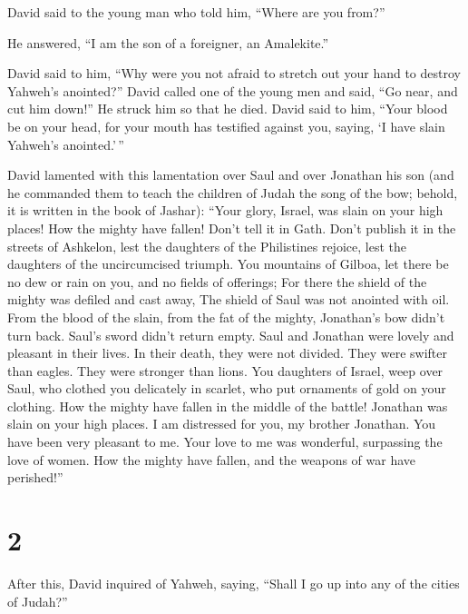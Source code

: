  David said to the young man who told him, ``Where are
you from?''

He answered, ``I am the son of a foreigner, an Amalekite.''

 David said to him, ``Why were you not afraid to stretch
out your hand to destroy Yahweh's anointed?''  David
called one of the young men and said, ``Go near, and cut him down!'' He
struck him so that he died.  David said to him, ``Your
blood be on your head, for your mouth has testified against you, saying,
`I have slain Yahweh's anointed.'\,''

 David lamented with this lamentation over Saul and over
Jonathan his son  (and he commanded them to teach the
children of Judah the song of the bow; behold, it is written in the book
of Jashar):  ``Your glory, Israel, was slain on your high
places! How the mighty have fallen!  Don't tell it in
Gath. Don't publish it in the streets of Ashkelon, lest the daughters of
the Philistines rejoice, lest the daughters of the uncircumcised
triumph.  You mountains of Gilboa, let there be no dew or
rain on you, and no fields of offerings; For there the shield of the
mighty was defiled and cast away, The shield of Saul was not anointed
with oil.  From the blood of the slain, from the fat of
the mighty, Jonathan's bow didn't turn back. Saul's sword didn't return
empty.  Saul and Jonathan were lovely and pleasant in
their lives. In their death, they were not divided. They were swifter
than eagles. They were stronger than lions.  You
daughters of Israel, weep over Saul, who clothed you delicately in
scarlet, who put ornaments of gold on your clothing.  How
the mighty have fallen in the middle of the battle! Jonathan was slain
on your high places.  I am distressed for you, my brother
Jonathan. You have been very pleasant to me. Your love to me was
wonderful, surpassing the love of women.  How the mighty
have fallen, and the weapons of war have perished!''

\hypertarget{section-1}{%
\section{2}\label{section-1}}

 After this, David inquired of Yahweh, saying, ``Shall I
go up into any of the cities of Judah?''

